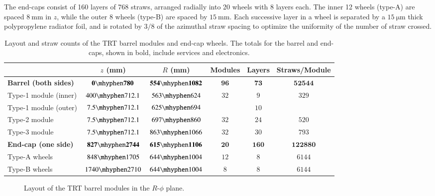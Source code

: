 The end-caps consist of 160 layers of 768 straws, arranged radially into 20 wheels with 8 layers each. The inner 12 wheels (type-A) are spaced $\SI{8}{\milli\meter}$ in $z$, while the outer 8 wheels (type-B) are spaced by $\SI{15}{\milli\meter}$. Each successive layer in a wheel is separated by a $\SI{15}{\micro\meter}$ thick polypropylene radiator foil, and is rotated by $3/8$ of the azimuthal straw spacing to optimize the uniformity of the number of straw crossed.


\begin{table}[htbp]
	\centering
	\begin{tabular}{|l|c|c|c|c|c|}
		\hline
		 & $z$ (mm) & $R$ (mm) & Modules & Layers & Straws/Module \\
		 \hline
		 \textbf{Barrel (both sides)} & $\mathbf{0\mhyphen780}$ & $\mathbf{554\mhyphen1082}$ & $\mathbf{96}$ & $\mathbf{73}$ & $\mathbf{52544}$ \\
		 Type-1 module (inner) & $400\mhyphen712.1$ & $563\mhyphen624$ & \multirow{2}{*}{$32$} & $9$ & \multirow{2}{*}{$329$} \\
		 Type-1 module (outer) & $7.5\mhyphen712.1$ & $625\mhyphen 694$ & & $10$ & \\
		 Type-2 module & $7.5\mhyphen 712.1$ & $697\mhyphen860$ & $32$ & $24$ & $520$ \\
		 Type-3 module & $7.5\mhyphen 712.1$ & $863\mhyphen 1066$ & $32$ & $30$ & $793$ \\
		 \hline
		 \textbf{End-cap (one side)} & $\mathbf{827\mhyphen 2744}$ & $\mathbf{615\mhyphen1106}$ & $\mathbf{20}$ & $\mathbf{160}$ & $\mathbf{122880}$ \\
		 Type-A wheels & $848\mhyphen1705$ & $644\mhyphen1004$ & $12$ & $8$ & $6144$ \\
		 Type-B wheels & $1740\mhyphen2710$ & $644\mhyphen1004$ & $8$ & $8$ & $6144$ \\
		 \hline
	\end{tabular}
	\caption{Layout and straw counts of the TRT barrel modules and end-cap wheels. The totals for the barrel and end-caps, shown in bold, include services and electronics.}	
	\label{table:ATLAS-TRT-layout}
\end{table}

\begin{figure}[htbp]
	\centering
	\caption{Layout of the TRT barrel modules in the $R$-$\phi$ plane.}
	\label{fig:ATLAS-TRT-barrel-modules}
\end{figure}



